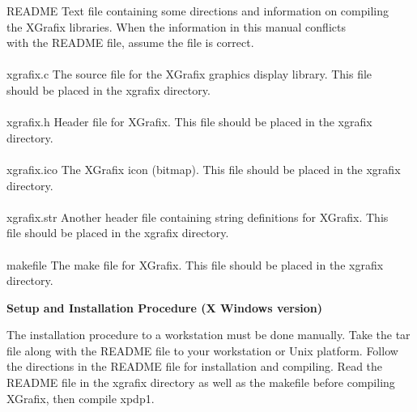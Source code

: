 \begin{section}
\begin{subsection}
\begin{tabbing}
        README     \>  Text file containing some directions and
                       information on compiling \> \\
		   \>  the \mbox{XGrafix} libraries.
                       When the information in this manual conflicts \> \\
		   \>  with
                       the \mbox{README} file, assume the file is correct. \> \\
									\\
        xgrafix.c  \>  The source file for the \mbox{XGrafix} 
				graphics display
                       library.  This file \> \\
		   \>  should be placed in the 
			\mbox{xgrafix} directory. \> \\
							\\
        xgrafix.h  \>  Header file for \mbox{XGrafix}.  This file should be
                       placed in the \mbox{xgrafix} \> \\
		   \>  directory. \> \\
						\\
        xgrafix.ico \> The \mbox{XGrafix} icon (bitmap).  This file should be
                       placed in the \mbox{xgrafix} \> \\
		    \> directory. \> \\
							\\
        xgrafix.str \> Another header file containing string definitions
                       for XGrafix.  This \> \\
		    \> file should be placed in the xgrafix directory. \> \\
								\\
        makefile    \> The make file for \mbox{XGrafix}.  This file should be
                       placed in the \mbox{xgrafix} directory. \> 
\end{tabbing}

\end{subsection}

\begin{subsection}
{\bf Setup and Installation Procedure (X Windows version)}

   The installation procedure to a workstation must be done manually.  Take the
   tar file along with the README file to your workstation or Unix platform.
   Follow the directions in the README file for installation and compiling.
   Read the README file in the xgrafix directory as well as the makefile before
   compiling XGrafix, then compile xpdp1.
\end{subsection}
\end{section}
